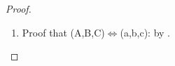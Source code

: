 \begin{proof}
\begin{enumerate}
  \item Proof that (A,B,C)$\iff$(a,b,c): by .
\end{enumerate}
%
%
\end{proof}

